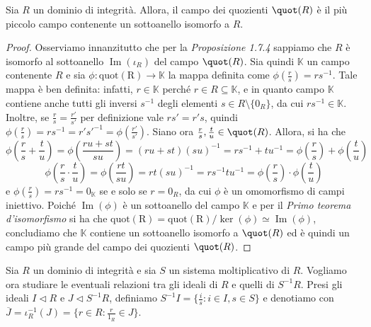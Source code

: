 \begin{prop}[1.7.5]{}
Sia $R$ un dominio di integrità. Allora, il campo dei quozienti $\quot(R)$ è il più piccolo campo contenente un sottoanello isomorfo a $R$.
\end{prop}
\vspace{-4mm}
\begin{proof}
Osserviamo innanzitutto che per la \emph{Proposizione 1.7.4} sappiamo che $R$ è isomorfo al sottoanello $\operatorname{Im}(\iota_R)$ del campo $\quot(R)$. Sia quindi $\mathbb{K}$ un campo contenente $R$ e sia $\phi\colon \operatorname{quot(R)}\to \mathbb{K}$ la mappa definita come $\phi(\frac{r}{s})=rs^{-1}$. Tale mappa è ben definita: infatti, $r\in \mathbb{K}$ perché $r\in R\subseteq \mathbb{K}$, e in quanto campo $\mathbb{K}$ contiene anche tutti gli inversi $s^{-1}$ degli elementi $s\in R\setminus\{0_R\}$, da cui $rs^{-1}\in \mathbb{K}$. Inoltre, se $\frac{r}{s}=\frac{r'}{s'}$ per definizione vale $rs'=r's$, quindi $\phi(\frac{r}{s})=rs^{-1}=r's'^{-1}=\phi(\frac{r'}{s'})$. Siano ora $\frac{r}{s}, \frac{t}{u}\in \quot(R)$. Allora, si ha che \[\phi\left(\frac{r}{s}+\frac{t}{u}\right)=\phi\left(\frac{ru+st}{su}\right)=(ru+st)(su)^{-1}=rs^{-1}+tu^{-1}=\phi\left(\frac{r}{s}\right)+\phi\left(\frac{t}{u}\right)\] \[\phi\left(\frac{r}{s}\cdot \frac{t}{u}\right)=\phi\left(\frac{rt}{su}\right)=rt(su)^{-1}=rs^{-1}tu^{-1}=\phi\left(\frac{r}{s}\right)\cdot \phi\left(\frac{t}{u}\right)\] e $\phi(\frac{r}{s})=rs^{-1}=0_{\mathbb{K}}$ se e solo se $r=0_R$, da cui $\phi$ è un omomorfismo di campi iniettivo. Poiché $\operatorname{Im}(\phi)$ è un sottoanello del campo $\mathbb{K}$ e per il \emph{Primo teorema d'isomorfismo} si ha che $\operatorname{quot(R)}=\operatorname{quot(R)}/\ker(\phi)\simeq \operatorname{Im}(\phi)$, concludiamo che $\mathbb{K}$ contiene un sottoanello isomorfo a $\quot(R)$ ed è quindi un campo più grande del campo dei quozienti $\quot(R)$. 
\end{proof}

\noindent Sia $R$ un dominio di integrità e sia $S$ un sistema moltiplicativo di $R$. Vogliamo ora studiare le eventuali relazioni tra gli ideali di $R$ e quelli di $S^{-1}R$. Presi gli ideali $I\lhd R$ e $J\lhd S^{-1}R$, definiamo $S^{-1}I=\{\frac{i}{s}: i\in I, s\in S\}$ e denotiamo con $\overline{J}=\iota_R^{-1}(J)=\{r\in R: \frac{r}{1_R}\in J\}$.

